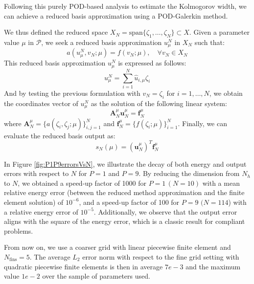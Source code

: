 \documentclass[graybox]{svmult}
\begin{document}
Following this purely POD-based analysis to estimate the Kolmogorov width, we can achieve a reduced basis approximation using a POD-Galerkin method. 

We thus defined the reduced space $X_N = \text{span}\{\zeta_1,\dots,\zeta_N\} \subset X$. Given a parameter value $\mu$ in ${\mathcal P}$,  we seek a reduced basis approximation $u^N_\mu$ in $X_N$ such that:
\begin{equation}
  \label{eq:reducedvarpb}
  a(u^N_\mu,v_N;\mu) = f(v_N;\mu), \quad \forall v_N \in X_N
\end{equation}
This reduced basis approximation $u^N_\mu$ is expressed as follows:
\begin{equation}
  \label{eq:reducedapprox}
  u^N_\mu = \sum_{i=1}^{N} \hat u_{i,\mu} \zeta_i
\end{equation}
And by testing the previous formulation with $v_N=\zeta_i$ for $i=1,\dots,N$, we obtain the coordinates vector of $u^N_\mu$ as the solution of the following linear system:
\begin{equation}
  \label{eq:reducedmatrix}
  \mathbf{A}_{N}^{\mu}\mathbf{u}_{N}^{\mu} = \mathbf{f}_{N}^{\mu}
\end{equation}
where $\mathbf{A}_{N}^{\mu}=\{a(\zeta_i,\zeta_j;\mu)\}_{i,j=1}^{N}$ and $\mathbf{f}_{N}^{\mu} = \{f(\zeta_i;\mu)\}_{i=1}^{N}$. Finally, we can evaluate the reduced basis output as:
\begin{equation}
  \label{eq:reducedoutput}
  s_N(\mu) = (\mathbf{u}_{N}^{\mu})^T \mathbf{f}_{N}^{\mu}
\end{equation}

In Figure \ref{fig:P1P9errorsVsN}, we illustrate the decay of both energy and output errors with respect to $N$ for $P = 1$ and $P = 9$. By reducing the dimension from $N_h$ to $N$, we obtained a speed-up factor of 1000 for $P = 1 \,(N = 10)$ with a mean relative energy error (between the reduced method approximation and the finite element solution) of $10^{-6}$, and a speed-up factor of 100 for $P = 9$ $(N = 114$) with a relative energy error of $10^{-5}$.  Additionally, we observe that the output error aligns with the square of the energy error, which is a classic result for compliant problems.



From now on, we use a coarser grid with linear piecewise finite element and $N_{\mathrm{fins}}=5.$ 
The average $L_2$ error norm with respect to the fine grid setting with quadratic piecewise finite elements is then in average $7e-3$ and the maximum value $1e-2$ over the sample of parameters used.
\end{document}

